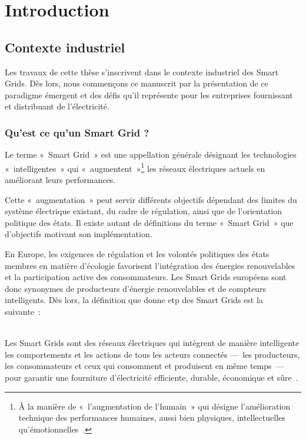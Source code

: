 \chapter{Introduction}
\label{ch:problematique}


\section{Contexte industriel}

Les travaux de cette thèse s'inscrivent dans le contexte industriel des Smart Grids.
Dès lors, nous commençons ce manuscrit par la présentation de ce paradigme émergent et
des défis qu'il représente pour les entreprises fournissant et distribuant de l'électricité.

\subsection{Qu'est ce qu'un Smart Grid ?}

Le terme «~Smart Grid~» est une appellation générale désignant les technologies 
«~intelligentes~» qui «~augmentent~»\footnote{À la manière de «~l'augmentation 
de l'humain~» qui désigne l'amélioration technique des performances humaines, 
aussi bien physiques, intellectuelles qu'émotionnelles~\cite{le2013humain}.} 
les réseaux électriques actuels en améliorant leurs performances. 

Cette «~augmentation~» peut servir différents objectifs dépendant des limites du 
système électrique existant, du cadre de régulation, ainsi que de 
l'orientation politique des états. Il existe autant de définitions du terme 
«~Smart Grid~» que d'objectifs motivant son implémentation. 

En Europe, les exigences de régulation et les volontés politiques des états 
membres en matière d'écologie favorisent l'intégration des énergies 
renouvelables et la participation active des consommateurs. Les Smart Grids 
européens sont donc synonymes de producteurs d'énergie renouvelables et de 
compteurs intelligents. Dès lors, la définition que donne \gls{etp} des
Smart Grids est la suivante~:
\\\
 \begin{definition}
Les Smart Grids sont des réseaux électriques qui intègrent de manière 
intelligente les comportements et 
les actions de tous les acteurs connectés —~les producteurs, les consommateurs 
et ceux qui consomment et produisent en même temps~— pour garantir une 
fourniture d'électricité efficiente, durable, économique et sûre~\cite{ETP}.
 \end{definition}

